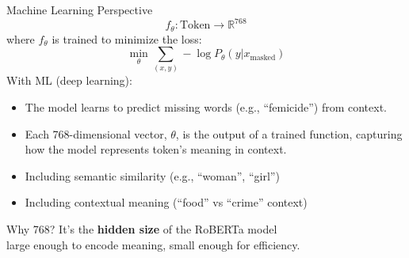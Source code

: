 \documentclass[xcolor=x11names,  aspectratio=169, compress]{beamer}
\renewcommand{\(}{\begin{columns}}
\renewcommand{\)}{\end{columns}}
\newcommand{\<}[1]{\begin{column}{#1}}
\renewcommand{\>}{\end{column}}
\begin{document}
\begin{frame}{Machine Learning Perspective}
\small
  \[
  f_\theta: \text{Token} \rightarrow \mathbb{R}^{768}
  \]
  \vspace{0.2cm}
  where $f_\theta$ is trained to minimize the loss:
  \[
  \min_\theta \sum_{(x,y)} -\log P_\theta(y | x_{\text{masked}})
  \]
 With ML (deep learning):
  \begin{itemize}
    \item The model learns to predict missing words (e.g., “femicide”) from context. %
     \item Each 768-dimensional vector, $\theta$, is the output of a trained function, capturing how the model represents token’s meaning in context.
      \item Including semantic similarity (e.g., “woman”, “girl”)
      \item Including contextual meaning (“food” vs “crime” context)
  \end{itemize}
 \hfill {\tiny Why 768? It’s the \textbf{hidden size} of the RoBERTa model\\
\hfill large enough to encode meaning, small enough for efficiency.}
\end{frame}
\end{document}
